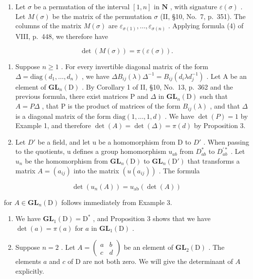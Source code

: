 \begin{enumerate}
\def\labelenumi{\arabic{enumi})}
\setcounter{enumi}{1}
\tightlist
\item
  Let \(\sigma\) be a permutation of the interval \([1,n]\) in \(\mathbf{N}\) , with signature \(\varepsilon(\sigma)\) . Let \(M(\sigma)\) be the matrix of the permutation \(\sigma\) (II, §10, No.~7, p.~351). The columns of the matrix \(M(\sigma)\) are \(\varepsilon_{\sigma(1)},\ldots,\varepsilon_{\sigma(n)}\) . Applying formula (4) of VIII, p.~448, we therefore have
\end{enumerate}

\[
\det (M (\sigma)) = \pi (\varepsilon (\sigma)).\tag{22}
\]

\begin{enumerate}
\def\labelenumi{\arabic{enumi})}
\setcounter{enumi}{2}
\item
  Suppose \(n \geqslant 1\) . For every invertible diagonal matrix of the form \(\Delta = \text{diag}(d_1, \ldots, d_n)\) , we have \(\Delta B_{ij}(\lambda)\Delta^{-1} = B_{ij}(d_i\lambda d_j^{-1})\) . Let A be an element of \(\mathbf{GL}_n(\mathrm{D})\) . By Corollary 1 of II, §10, No.~13, p.~362 and the previous formula, there exist matrices P and \(\Delta\) in \(\mathbf{GL}_n(\mathrm{D})\) such that \(A = P\Delta\) , that P is the product of matrices of the form \(B_{ij}(\lambda)\) , and that \(\Delta\) is a diagonal matrix of the form \(\text{diag}(1, \ldots, 1, d)\) . We have \(\det(P) = 1\) by Example 1, and therefore \(\det(A) = \det(\Delta) = \pi(d)\) by Proposition 3.
\item
  Let \(D'\) be a field, and let u be a homomorphism from D to \(D'\) . When passing to the quotients, u defines a group homomorphism \(u_{ab}\) from \(D_{ab}^{*}\) to \(D_{ab}^{\prime *}\) . Let \(u_{n}\) be the homomorphism from \(\mathbf{GL}_{n}(\mathrm{D})\) to \(\mathbf{GL}_{n}(\mathrm{D}')\) that transforms a matrix \(A = (a_{ij})\) into the matrix \((u(a_{ij}))\) . The formula
\end{enumerate}

\[
\det (u _ {n} (A)) = u _ {\mathrm{ab}} (\det (A))\tag{23}
\]

for \(A \in \mathbf{GL}_n(\mathrm{D})\) follows immediately from Example 3.

\begin{enumerate}
\def\labelenumi{\arabic{enumi})}
\setcounter{enumi}{4}
\item
  We have \(\mathbf{GL}_1(\mathrm{D}) = \mathrm{D}^*\) , and Proposition 3 shows that we have \(\det(a) = \pi(a)\) for \(a\) in \(\mathbf{GL}_1(\mathrm{D})\) .
\item
  Suppose \(n = 2\) . Let \(A = \begin{pmatrix} a & b \\ c & d \end{pmatrix}\) be an element of \(\mathbf{GL}_2(\mathrm{D})\) . The elements \(a\) and \(c\) of \(\mathrm{D}\) are not both zero. We will give the determinant of \(A\) explicitly.
\end{enumerate}

